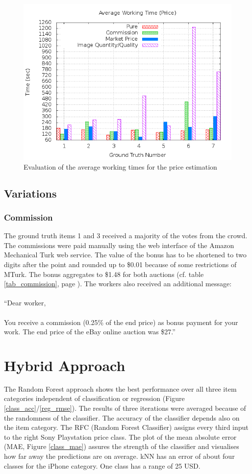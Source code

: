 \begin{figure}
\centering
\includegraphics[scale=0.55]{images/plots/crowdsourcing/plot_time_price.png}
\caption{Evaluation of the average working times for the price estimation}
\label{crowdsourcing_time_price}
\end{figure}
\subsection{Variations}
\subsubsection{Commission}
The ground truth items 1 and 3 received a majority of the votes from the crowd. The commissions were paid manually using the web interface of the Amazon Mechanical Turk web service. The value of the bonus has to be shortened to two digits after the point and rounded up to \$0.01 because of some restrictions of MTurk. The bonus aggregates to \$1.48 for both auctions (cf. table \ref{tab_commission}, page \pageref{tab_commission}). The workers also received an additional message:\\\\
``Dear worker, \\\\
You receive a commission (0.25\% of the end price) as bonus payment for your work. The end price of the eBay online auction was \$27.''
\section{Hybrid Approach}
The Random Forest approach shows the best performance over all three item categories independent of classification or regression (Figure \ref{class_acc}/\ref{reg_rmse}). The results of three iterations were averaged because of the randomness of the classifier. The accuracy of the classifier depends also on the item category. The RFC (Random Forest Classifier) assigns every third input to the right Sony Playstation price class. The plot of the mean absolute error (MAE, Figure \ref{class_mae}) assures the strength of the classifier and visualises how far away the predictions are on average. kNN has an error of about four classes for the iPhone category. One class has a range of 25 USD.

